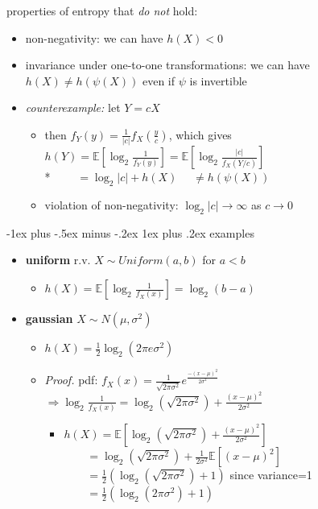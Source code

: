 \documentclass[10pt, landscape]{article}
\makeatletter
\renewcommand{\subsubsection}{\@startsection{subsubsection}{3}{0mm}%
  {-1ex plus -.5ex minus -.2ex}%
  {1ex plus .2ex}%
{\normalfont\small\bfseries}}%
\makeatother
\begin{document}
\begin{multicols*}{4}
  properties of entropy that \textit{do not} hold:

  \begin{itemize}
    \item non-negativity: we can have $h(X) < 0$
    \item invariance under one-to-one transformations: we can have $h(X) \neq h(\psi(X))$ even if $\psi$ is invertible
    \item \textit{counterexample:} let $Y=cX$
      \begin{itemize}
        \item then $f_Y(y) = \frac{1}{\vert c \vert} f_X (\frac{y}{c})$, 
          which gives $h(Y) = \mathbb{E}[\log_2 \frac{1}{f_Y(y)}] = \mathbb{E}[\log_2 \frac{|c|}{f_X(Y/c)}]$ \\* 
          $\quad\quad = \log_2|c| + h(X)$ $\quad \neq h(\psi(X))$
        \item violation of non-negativity: $\log_2|c| \to \infty$ as $c \to 0$
      \end{itemize}
  \end{itemize}

  \subsubsection{examples}

  \begin{itemize}
    \item \textbf{uniform} r.v. $X \sim Uniform(a, b)$ for $a<b$
      \begin{itemize}
        \item $h(X) = \mathbb{E}[\log_2 \frac{1}{f_X(x)}] = \log_2(b-a)$
      \end{itemize}
    \item \textbf{gaussian} $X \sim N(\mu, \sigma^2)$
      \begin{itemize}
        \item $h(X) = \frac{1}{2}\log_2 (2\pi e \sigma^2)$
        \item \textit{Proof.} pdf: $f_X(x) = \frac{1}{\sqrt{2\pi \sigma^2}} e^{\frac{-(x-\mu)^2}{2\sigma^2}}$
          $\Rightarrow \log_2 \frac{1}{f_X(x)} = \log_2(\sqrt{2\pi\sigma^2}) + \frac{(x-\mu)^2}{2\sigma^2}$
          \begin{itemize}
            \item $h(X) = \mathbb{E}[\log_2(\sqrt{2\pi\sigma^2}) + \frac{(x-\mu)^2}{2\sigma^2}]$
              $\quad\quad = \log_2(\sqrt{2\pi\sigma^2}) + \frac{1}{2\sigma^2}\mathbb{E}[(x-\mu)^2]$
              $\quad\quad = \frac{1}{2}(\log_2(\sqrt{2\pi\sigma^2}) + 1)$ since variance=1
              $\quad\quad = \frac{1}{2}(\log_2(2\pi\sigma^2) + 1)$


\end{itemize}
\end{itemize}
\end{itemize}
\end{multicols*}
\end{document}
